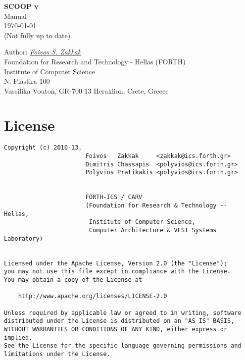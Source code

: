 \documentclass[
a4paper,
12pt,
]{article}
\begin{document}
\begin{titlepage}
\begin{center}

  \vspace*{5cm}

  \LARGE \textbf{SCOOP v\scoopversion\\}
  Manual\\[0.5cm]
  \large \today\\ (Not fully up to date)

  \vfill

  \large Author: \href{mailto:zakkak@ics.forth.gr}{\textit{Foivos S. Zakkak}}\\[1cm]

  Foundation for Research and Technology - Hellas (FORTH)\\
  Institute of Computer Science\\
  N. Plastira 100\\
  Vassilika Vouton, GR-700 13 Heraklion, Crete, Greece\\[0.5cm]

\end{center}

\end{titlepage}

\pagestyle{plain}

\section*{License}

\begin{verbatim}
Copyright (c) 2010-13,
                       Foivos   Zakkak     <zakkak@ics.forth.gr>
                       Dimitris Chassapis  <polyvios@ics.forth.gr>
                       Polyvios Pratikakis <polyvios@ics.forth.gr>


                       FORTH-ICS / CARV
                       (Foundation for Research & Technology -- Hellas,
                        Institute of Computer Science,
                        Computer Architecture & VLSI Systems Laboratory)


Licensed under the Apache License, Version 2.0 (the "License");
you may not use this file except in compliance with the License.
You may obtain a copy of the License at

    http://www.apache.org/licenses/LICENSE-2.0

Unless required by applicable law or agreed to in writing, software
distributed under the License is distributed on an "AS IS" BASIS,
WITHOUT WARRANTIES OR CONDITIONS OF ANY KIND, either express or implied.
See the License for the specific language governing permissions and
limitations under the License.
\end{verbatim}
\end{document}
